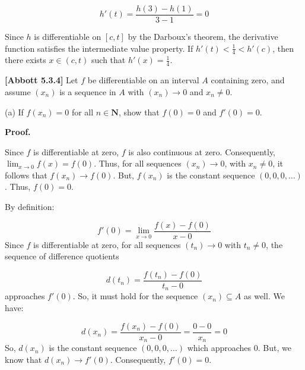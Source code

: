 \documentclass[10pt]{article}
\begin{document}
\begin{equation*}
h'( t) =\frac{h( 3) -h( 1)}{3-1} =0
\end{equation*}


Since $\displaystyle h$ is differentiable on $\displaystyle [ c,t]$ by the Darboux's theorem, the derivative function satisfies the intermediate value property. If $\displaystyle h'( t) < \frac{1}{4} < h'( c)$, then there exists $\displaystyle x\in ( c,t)$ such that $\displaystyle h'( x) =\frac{1}{4}$.



\textbf{[Abbott 5.3.4]} Let $\displaystyle f$ be differentiable on an interval $\displaystyle A$ containing zero, and assume $\displaystyle ( x_{n})$ is a sequence in $\displaystyle A$ with $\displaystyle ( x_{n})\rightarrow 0$ and $\displaystyle x_{n} \neq 0$.



(a) If $\displaystyle f( x_{n}) =0$ for all $\displaystyle n\in \mathbf{N}$, show that $\displaystyle f( 0) =0$ and $\displaystyle f'( 0) =0$.



\textbf{Proof.}



Since $\displaystyle f$ is differentiable at zero, $\displaystyle f$ is also continuous at zero. Consequently, $\displaystyle \lim _{x\rightarrow 0} f( x) =f( 0)$. Thus, for all sequences $\displaystyle ( x_{n})\rightarrow 0$, with $\displaystyle x_{n} \neq 0$, it follows that $\displaystyle f( x_{n})\rightarrow f( 0)$. But, $\displaystyle f( x_{n})$ is the constant sequence $\displaystyle ( 0,0,0,\dotsc )$. Thus, $\displaystyle f( 0) =0$.



By definition:


\begin{equation*}
f'( 0) =\lim _{x\rightarrow 0}\frac{f( x) -f( 0)}{x-0}
\end{equation*}
Since $\displaystyle f$ is differentiable at zero, for all sequences $\displaystyle ( t_{n})\rightarrow 0$ with $\displaystyle t_{n} \neq 0$, the sequence of difference quotients 


\begin{equation*}
d( t_{n}) =\frac{f( t_{n}) -f( 0)}{t_{n} -0}
\end{equation*}
approaches $\displaystyle f'( 0)$. So, it must hold for the sequence $\displaystyle ( x_{n}) \subseteq A$ as well. We have:


\begin{equation*}
d( x_{n}) =\frac{f( x_{n}) -f( 0)}{x_{n} -0} =\frac{0-0}{x_{n}} =0
\end{equation*}
So, $\displaystyle d( x_{n})$ is the constant sequence $\displaystyle ( 0,0,0,\dotsc )$ which approaches $\displaystyle 0$. But, we know that $\displaystyle d( x_{n})\rightarrow f'( 0)$. Consequently, $\displaystyle f'( 0) =0$.
\end{document}
